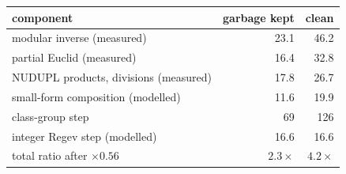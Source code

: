 \begin{tabular}{lrr}
\toprule
component & garbage kept & clean \\
\midrule
modular inverse (measured) & 23.1 & 46.2\\
partial Euclid (measured) & 16.4 & 32.8\\
NUDUPL products, divisions (measured) & 17.8 & 26.7\\
small-form composition (modelled) & 11.6 & 19.9\\
\midrule
class-group step & 69 & 126\\
integer Regev step (modelled) & 16.6 & 16.6\\
total ratio after $\times0.56$ & $2.3\times$ & $4.2\times$\\
\bottomrule
\end{tabular}